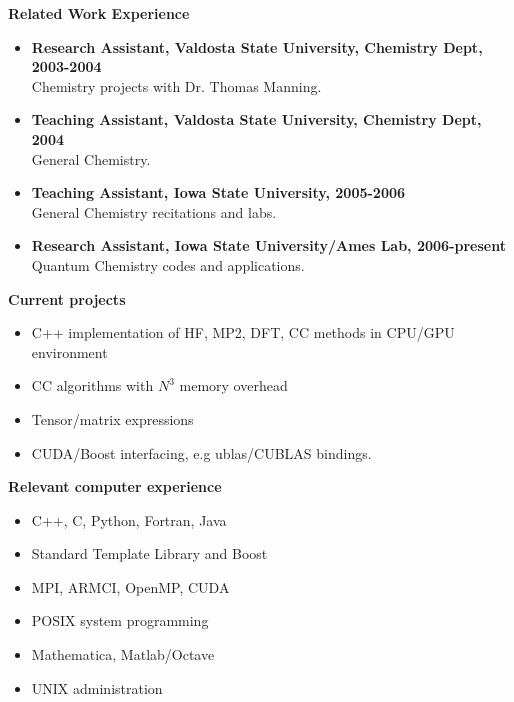 \documentclass[10pt,oneside]{article}
\begin{document}
{  \normalsize
  \textbf{Related Work Experience}
  \small
  \begin{itemize}
  \item{
    \textbf{Research Assistant, Valdosta State University, Chemistry Dept, 2003-2004} \\
    Chemistry projects with Dr. Thomas Manning.
  }
  \item{
    \textbf{Teaching Assistant, Valdosta State University, Chemistry Dept, 2004} \\
    General Chemistry.
  }
  \item{
    \textbf{Teaching Assistant, Iowa State University, 2005-2006} \\
    General Chemistry recitations and labs.
  }
  \item
    \textbf{Research Assistant, Iowa State University/Ames Lab, 2006-present} \\
    Quantum Chemistry codes and applications.
  \end{itemize}

  \normalsize
  \textbf{Current projects}
  \small
  \begin{itemize}
  \item C++ implementation of HF, MP2, DFT, CC methods in CPU/GPU environment
  \item CC algorithms with $N^3$ memory overhead
  \item Tensor/matrix expressions
  \item CUDA/Boost interfacing, e.g ublas/CUBLAS bindings.
  \end{itemize}
  
  \normalsize
  \textbf{Relevant computer experience}
  \small
  \begin{itemize}
  \item{C++, C, Python, Fortran, Java}
  \item{Standard Template Library and Boost}
  \item{MPI, ARMCI, OpenMP, CUDA}
  \item{POSIX system programming}
  \item{Mathematica, Matlab/Octave}
  \item{UNIX administration}
  \end{itemize}
 
\newpage

}
\end{document}
